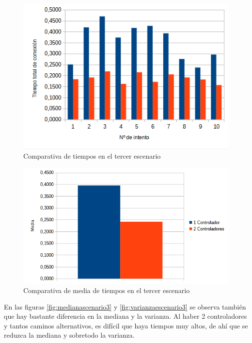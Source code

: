 \documentclass[a4paper, 12pt]{book}
\begin{document}
 	\begin{figure}[H]
 		\centering
 		\includegraphics[width=12cm, keepaspectratio]{img/comparativaescenario3}
 		\caption{Comparativa de tiempos en el tercer escenario}
 		\label{figura:comparativab4}
 	\end{figure}
 	
 	
 	
 	\begin{figure}[H]
 		\centering
 		\includegraphics[width=12cm, keepaspectratio]{img/comparativamediaescenario3}
 		\caption{Comparativa de media de tiempos en el tercer escenario}
 		\label{figura:mediab4}
 	\end{figure}
 	
 	En las figuras \ref{fig:medianascenario3} y \ref{fig:varianzaescenario3} se observa también que hay bastante diferencia en la mediana y la varianza. Al haber 2 controladores y tantos caminos alternativos, es difícil que haya tiempos muy altos, de ahí que se reduzca la mediana y sobretodo la varianza.
 	
\end{document}
